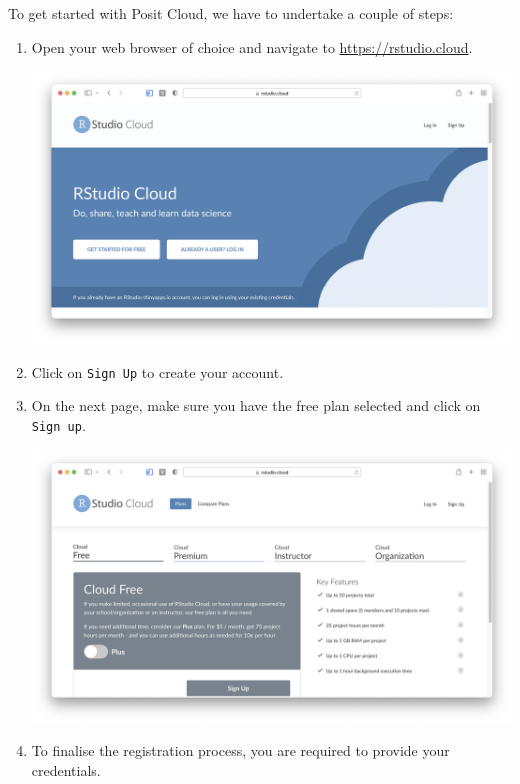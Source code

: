 \documentclass[
  letterpaper,
  DIV=11,
  numbers=noendperiod]{scrreprt}
\begin{document}
To get started with Posit Cloud, we have to undertake a couple of steps:

\begin{enumerate}
\def\labelenumi{\arabic{enumi}.}
\item
  Open your web browser of choice and navigate to
  \url{https://rstudio.cloud}.

  \includegraphics{images/chapter_03_img/rstudio_cloud/01_rstudio_cloud.png}
\item
  Click on \texttt{Sign\ Up} to create your account.
\item
  On the next page, make sure you have the free plan selected and click
  on \texttt{Sign\ up}.

  \includegraphics{images/chapter_03_img/rstudio_cloud/02_rstudio_cloud.png}
\item
  To finalise the registration process, you are required to provide your
  credentials.


\end{enumerate}
\end{document}
